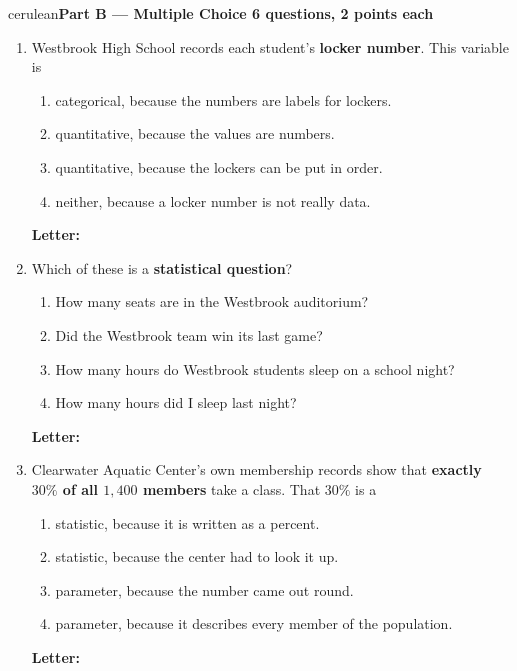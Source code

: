 \documentclass[10pt]{article}
\newcommand{\parthead}[1]{%
  \vspace{6pt}\noindent
  {\tcbset{after={\par\nopagebreak}}%
   \begin{headlinebox}{cerulean}{\color{white}\bfseries #1}\end{headlinebox}}%
  \nopagebreak\vspace{4pt}}
\begin{document}
\vspace{4pt}
\boxguard[8]
\parthead{Part B --- Multiple Choice \hfill 6 questions, 2 points each}

\small
\begin{enumerate}[leftmargin=2.2em, itemsep=5pt, topsep=2pt, start=9]

\item Westbrook High School records each student's \textbf{locker number}. This variable is
\begin{enumerate}[label=(\Alph*), leftmargin=1.8em, itemsep=1pt, topsep=1pt]
  \item categorical, because the numbers are labels for lockers.
  \item quantitative, because the values are numbers.
  \item quantitative, because the lockers can be put in order.
  \item neither, because a locker number is not really data.
\end{enumerate}
\hfill \textbf{Letter:} \gradedblank[id=q9, type=choice, points=2, answer={A}]{0.9cm}{11pt}

\item Which of these is a \textbf{statistical question}?
\begin{enumerate}[label=(\Alph*), leftmargin=1.8em, itemsep=1pt, topsep=1pt]
  \item How many seats are in the Westbrook auditorium?
  \item Did the Westbrook team win its last game?
  \item How many hours do Westbrook students sleep on a school night?
  \item How many hours did I sleep last night?
\end{enumerate}
\hfill \textbf{Letter:} \gradedblank[id=q10, type=choice, points=2, answer={C}]{0.9cm}{11pt}

\item Clearwater Aquatic Center's own membership records show that \textbf{exactly $30\%$ of
all $1{,}400$ members} take a class. That $30\%$ is a
\begin{enumerate}[label=(\Alph*), leftmargin=1.8em, itemsep=1pt, topsep=1pt]
  \item statistic, because it is written as a percent.
  \item statistic, because the center had to look it up.
  \item parameter, because the number came out round.
  \item parameter, because it describes every member of the population.
\end{enumerate}
\hfill \textbf{Letter:} \gradedblank[id=q11, type=choice, points=2, answer={D}]{0.9cm}{11pt}


\end{enumerate}
\end{document}

